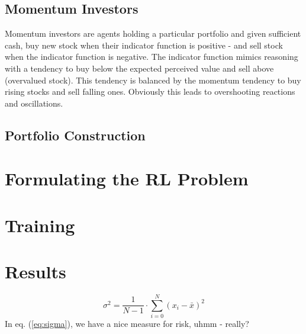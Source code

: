\documentclass{article}
\begin{document}
	\subsection{Momentum Investors}
	Momentum investors are agents holding a particular portfolio and given sufficient cash, buy new stock when their indicator function is positive - and sell stock when the indicator function is negative. The indicator function mimics reasoning with a tendency to buy below the expected perceived value and sell above (overvalued stock). This tendency is balanced by the momentum tendency to buy rising stocks and sell falling ones. Obviously this leads to overshooting reactions and oscillations. 
	\subsection{Portfolio Construction}
	
	\section{Formulating the RL Problem}
	
	\section{Training}
	
		
	\section{Results}
	
	\begin{equation}\label{eq:sigma}
	\sigma^2 =\frac{1}{N-1} \cdot \sum_{i=0}^N (x_i - \bar{x}) ^2
	\end{equation}
	In eq. (\ref{eq:sigma}), we have a nice measure for risk, uhmm - really?

	

\end{document}
